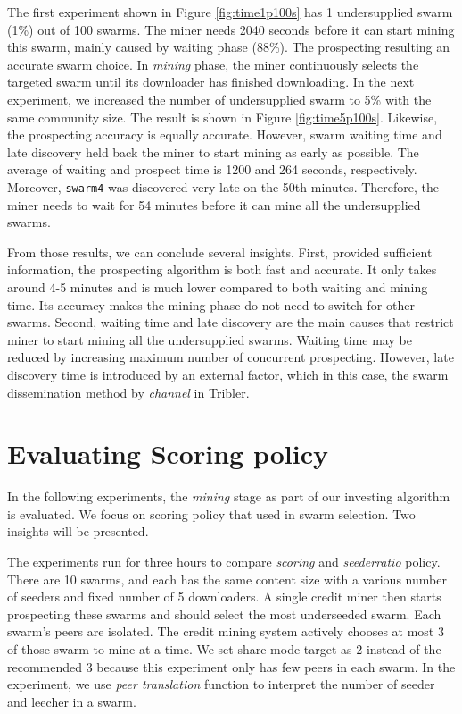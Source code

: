 The first experiment shown in Figure \ref{fig:time1p100s} has 1 undersupplied swarm (1\%) out of 100 swarms. The miner needs 2040 seconds before it can start mining this swarm, mainly caused by waiting phase (88\%). The prospecting resulting an accurate swarm choice. In \textit{mining} phase, the miner continuously selects the targeted swarm until its downloader has finished downloading. In the next experiment, we increased the number of undersupplied swarm to 5\% with the same community size. The result is shown in Figure \ref{fig:time5p100s}. Likewise, the prospecting accuracy is equally accurate. However, swarm waiting time and late discovery held back the miner to start mining as early as possible. The average of waiting and prospect time is 1200 and 264 seconds, respectively. Moreover, \texttt{swarm4} was discovered very late on the 50th minutes. Therefore, the miner needs to wait for 54 minutes before it can mine all the undersupplied swarms.

From those results, we can conclude several insights. First, provided sufficient information, the prospecting algorithm is both fast and accurate. It only takes around 4-5 minutes and is much lower compared to both waiting and mining time. Its accuracy makes the mining phase do not need to switch for other swarms. Second, waiting time and late discovery are the main causes that restrict miner to start mining all the undersupplied swarms. Waiting time may be reduced by increasing maximum number of concurrent prospecting. However, late discovery time is introduced by an external factor, which in this case, the swarm dissemination method by \textit{channel} in Tribler.

\section{Evaluating Scoring policy}
\label{section:evalscoring}
In the following experiments, the \textit{mining} stage as part of our investing algorithm is evaluated. We focus on scoring policy that used in swarm selection. Two insights will be presented. 

The experiments run for three hours to compare \textit{scoring} and \textit{seederratio} policy. There are 10 swarms, and each has the same content size with a various number of seeders and fixed number of 5 downloaders. A single credit miner then starts prospecting these swarms and should select the most underseeded swarm. Each swarm's peers are isolated. The credit mining system actively chooses at most 3 of those swarm to mine at a time. We set share mode target as 2 instead of the recommended 3 because this experiment only has few peers in each swarm. In the experiment, we use \textit{peer translation} function to interpret the number of seeder and leecher in a swarm.

